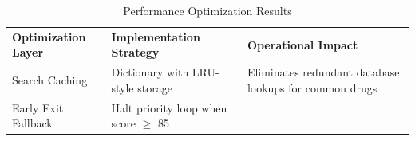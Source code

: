 \documentclass[12pt,a4paper,oneside]{report}
\begin{document}
\begin{longtable}[]{@{}
  >{\raggedright\arraybackslash}p{}
  >{\raggedright\arraybackslash}p{}
  >{\raggedright\arraybackslash}p{}@{}}
\caption{Performance Optimization Results\label{tab:table27}}\\

\toprule\noalign{}
\begin{minipage}[b]{\linewidth}\raggedright

\textbf{Optimization Layer}

\end{minipage} & \begin{minipage}[b]{\linewidth}\raggedright

\textbf{Implementation Strategy}

\end{minipage} & \begin{minipage}[b]{\linewidth}\raggedright

\textbf{Operational Impact}

\end{minipage} \\
\begin{minipage}[b]{\linewidth}\raggedright

Search Caching

\end{minipage} & \begin{minipage}[b]{\linewidth}\raggedright

Dictionary with LRU-style storage

\end{minipage} & \begin{minipage}[b]{\linewidth}\raggedright

Eliminates redundant database lookups for common drugs

\end{minipage} \\
\begin{minipage}[b]{\linewidth}\raggedright

Early Exit Fallback

\end{minipage} & \begin{minipage}[b]{\linewidth}\raggedright

Halt priority loop when score \emph{$\ge$} 85

\end{minipage} & \begin{minipage}[b]{\linewidth}\raggedright


\end{minipage}
\end{longtable}
\end{document}
